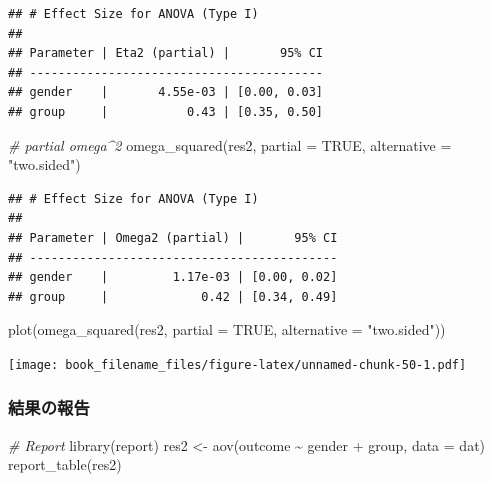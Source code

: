 \documentclass[
  ja=standard, xelatex, base=12pt]{bxjsreport}
\newenvironment{Shaded}{\begin{snugshade}}{\end{snugshade}}
\newcommand{\AttributeTok}[1]{\textcolor[rgb]{0.77,0.63,0.00}{#1}}
\newcommand{\CommentTok}[1]{\textcolor[rgb]{0.56,0.35,0.01}{\textit{#1}}}
\newcommand{\ConstantTok}[1]{\textcolor[rgb]{0.00,0.00,0.00}{#1}}
\newcommand{\FunctionTok}[1]{\textcolor[rgb]{0.00,0.00,0.00}{#1}}
\newcommand{\NormalTok}[1]{#1}
\newcommand{\OtherTok}[1]{\textcolor[rgb]{0.56,0.35,0.01}{#1}}
\newcommand{\SpecialCharTok}[1]{\textcolor[rgb]{0.00,0.00,0.00}{#1}}
\newcommand{\StringTok}[1]{\textcolor[rgb]{0.31,0.60,0.02}{#1}}
\begin{document}
\begin{verbatim}
## # Effect Size for ANOVA (Type I)
## 
## Parameter | Eta2 (partial) |       95% CI
## -----------------------------------------
## gender    |       4.55e-03 | [0.00, 0.03]
## group     |           0.43 | [0.35, 0.50]
\end{verbatim}

\begin{Shaded}
\begin{Highlighting}[]
\CommentTok{\# partial omega\^{}2}
\FunctionTok{omega\_squared}\NormalTok{(res2, }\AttributeTok{partial =} \ConstantTok{TRUE}\NormalTok{, }\AttributeTok{alternative =} \StringTok{"two.sided"}\NormalTok{)}
\end{Highlighting}
\end{Shaded}

\begin{verbatim}
## # Effect Size for ANOVA (Type I)
## 
## Parameter | Omega2 (partial) |       95% CI
## -------------------------------------------
## gender    |         1.17e-03 | [0.00, 0.02]
## group     |             0.42 | [0.34, 0.49]
\end{verbatim}

\begin{Shaded}
\begin{Highlighting}[]
\FunctionTok{plot}\NormalTok{(}\FunctionTok{omega\_squared}\NormalTok{(res2, }\AttributeTok{partial =} \ConstantTok{TRUE}\NormalTok{, }\AttributeTok{alternative =} \StringTok{"two.sided"}\NormalTok{))}
\end{Highlighting}
\end{Shaded}

\texttt{[image: book\_filename\_files/figure-latex/unnamed-chunk-50-1.pdf]}

\hypertarget{ux7d50ux679cux306eux5831ux544a-3}{%
\subsubsection{結果の報告}\label{ux7d50ux679cux306eux5831ux544a-3}}

\begin{Shaded}
\begin{Highlighting}[]
\CommentTok{\# Report}
\FunctionTok{library}\NormalTok{(report)}
\NormalTok{res2 }\OtherTok{\textless{}{-}} \FunctionTok{aov}\NormalTok{(outcome }\SpecialCharTok{\textasciitilde{}}\NormalTok{ gender }\SpecialCharTok{+}\NormalTok{ group, }\AttributeTok{data =}\NormalTok{ dat)}
\FunctionTok{report\_table}\NormalTok{(res2)}
\end{Highlighting}
\end{Shaded}
\end{document}
